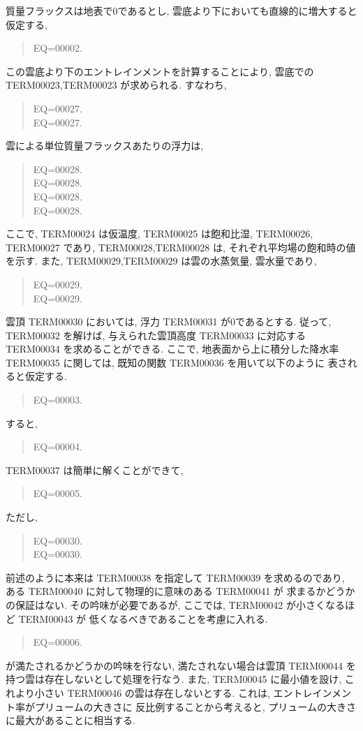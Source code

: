 質量フラックスは地表で0であるとし,
雲底より下においても直線的に増大すると仮定する,
\begin{quote}
EQ=00002.
\end{quote}
この雲底より下のエントレインメントを計算することにより,
雲底での TERM00023,TERM00023 が求められる. すなわち,
\begin{quote}
EQ=00027.\\
EQ=00027.
\end{quote}

雲による単位質量フラックスあたりの浮力は,
\begin{quote}
\nonumber
EQ=00028.\\
\nonumber
EQ=00028.\\
\nonumber
EQ=00028.\\
EQ=00028.
\end{quote}
ここで, TERM00024 は仮温度, TERM00025 は飽和比湿,
TERM00026,
TERM00027 であり,
TERM00028,TERM00028 は, それぞれ平均場の飽和時の値を示す.
また, TERM00029,TERM00029 は雲の水蒸気量, 雲水量であり,
\begin{quote}
EQ=00029.\\
EQ=00029.
\end{quote}
雲頂 TERM00030 においては, 浮力 TERM00031 が0であるとする.
従って, TERM00032 を解けば, 与えられた雲頂高度 TERM00033 に対応する
TERM00034 を求めることができる.
ここで, 地表面から上に積分した降水率 TERM00035 に関しては, 
既知の関数 TERM00036 を用いて以下のように
表されると仮定する. 
\begin{quote}
EQ=00003.
\end{quote}
すると, 
\begin{quote}
EQ=00004.
\end{quote}

TERM00037 は簡単に解くことができて,
\begin{quote}
EQ=00005.
\end{quote}
ただし, 
\begin{quote}
EQ=00030.\\
EQ=00030.
\end{quote}

前述のように本来は TERM00038 を指定して TERM00039 を求めるのであり,
ある TERM00040 に対して物理的に意味のある TERM00041 が
求まるかどうかの保証はない. 
その吟味が必要であるが, ここでは,
TERM00042 が小さくなるほど TERM00043 が
低くなるべきであることを考慮に入れる.
\begin{quote}
EQ=00006.
\end{quote}
が満たされるかどうかの吟味を行ない,
満たされない場合は雲頂 TERM00044 を持つ雲は存在しないとして処理を行なう.
また, TERM00045 に最小値を設け, 
これより小さい TERM00046 の雲は存在しないとする.
これは, エントレインメント率がプリュームの大きさに
反比例することから考えると, 
プリュームの大きさに最大があることに相当する.

